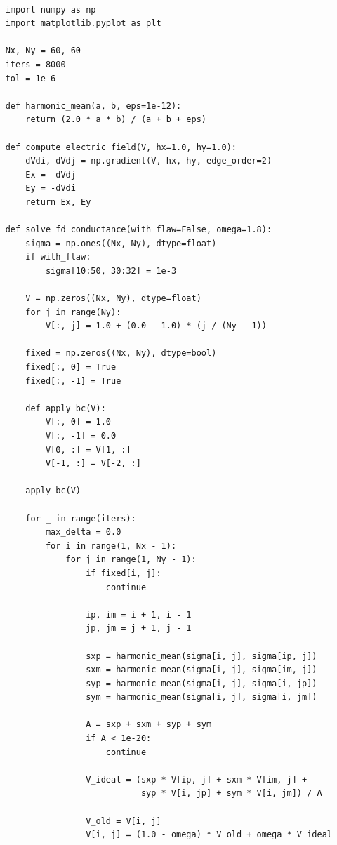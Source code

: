 \documentclass[reprint,amsmath,amssymb,aps]{revtex4-2}
\begin{document}
\begin{lstlisting}

    import numpy as np
    import matplotlib.pyplot as plt
    
    Nx, Ny = 60, 60
    iters = 8000
    tol = 1e-6
    
    def harmonic_mean(a, b, eps=1e-12):
        return (2.0 * a * b) / (a + b + eps)
    
    def compute_electric_field(V, hx=1.0, hy=1.0):
        dVdi, dVdj = np.gradient(V, hx, hy, edge_order=2)
        Ex = -dVdj 
        Ey = -dVdi
        return Ex, Ey
    
    def solve_fd_conductance(with_flaw=False, omega=1.8):
        sigma = np.ones((Nx, Ny), dtype=float)
        if with_flaw:
            sigma[10:50, 30:32] = 1e-3
    
        V = np.zeros((Nx, Ny), dtype=float)
        for j in range(Ny):
            V[:, j] = 1.0 + (0.0 - 1.0) * (j / (Ny - 1))
    
        fixed = np.zeros((Nx, Ny), dtype=bool)
        fixed[:, 0] = True
        fixed[:, -1] = True
    
        def apply_bc(V):
            V[:, 0] = 1.0  
            V[:, -1] = 0.0
            V[0, :] = V[1, :]      
            V[-1, :] = V[-2, :]    
    
        apply_bc(V)
    
        for _ in range(iters):
            max_delta = 0.0
            for i in range(1, Nx - 1):
                for j in range(1, Ny - 1):
                    if fixed[i, j]:
                        continue
    
                    ip, im = i + 1, i - 1
                    jp, jm = j + 1, j - 1
    
                    sxp = harmonic_mean(sigma[i, j], sigma[ip, j])
                    sxm = harmonic_mean(sigma[i, j], sigma[im, j])
                    syp = harmonic_mean(sigma[i, j], sigma[i, jp])
                    sym = harmonic_mean(sigma[i, j], sigma[i, jm])
    
                    A = sxp + sxm + syp + sym
                    if A < 1e-20:
                        continue
    
                    V_ideal = (sxp * V[ip, j] + sxm * V[im, j] +
                               syp * V[i, jp] + sym * V[i, jm]) / A
    
                    V_old = V[i, j]
                    V[i, j] = (1.0 - omega) * V_old + omega * V_ideal
    

\end{lstlisting}
\end{document}
